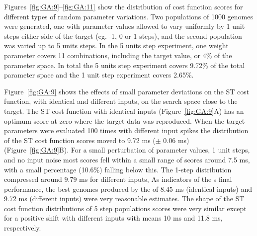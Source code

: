 





Figures~\ref{fig:GA:9}--\ref{fig:GA:11} show the distribution of cost function
scores for different types of random parameter variations. Two
populations of 1000 genomes were generated, one with parameter values
allowed to vary uniformly by 1 unit steps either side of the target
(eg. -1, 0 or 1 steps), and the second population was varied up to 5
units steps.  In the 5 units step experiment, one weight parameter
covers 11 combinations, including the target value, or 4\% of the
parameter space. In total the 5 units step experiment covers 9.72\% of
the total parameter space and the 1 unit step experiment covers
2.65\%.

\smallskip{}

Figure~\ref{fig:GA:9} shows the effects of small parameter deviations
on the ST cost function, with identical and different {\ANF} inputs, on
the search space close to the target. The ST cost function with
identical {\ANF} inputs (Figure~\ref{fig:GA:9}A) has an optimum score at zero where
the target data was reproduced. When the target parameters were
evaluated 100 times with different {\ANF} input spikes the distribution
of the ST cost function scores moved to 9.72 ms ($\pm$ 0.06 ms)
(Figure~\ref{fig:GA:9}B). For a small perturbation of parameter values, 1 unit
steps, and no input noise most scores fell within a small range of
scores around 7.5 ms, with a small percentage (10.6\%) falling below
this. The 1-step distribution compressed around 9.79 ms for different
inputs, As indicators of the {\GA}s final performance, the best genomes
produced by the {\GA} of 8.45 ms (identical inputs) and 9.72 ms
(different inputs) were very reasonable estimates.  The shape of the
ST cost function distributions of 5 step populations scores were very
similar except for a positive shift with different inputs with means
10 ms and 11.8 ms, respectively.

